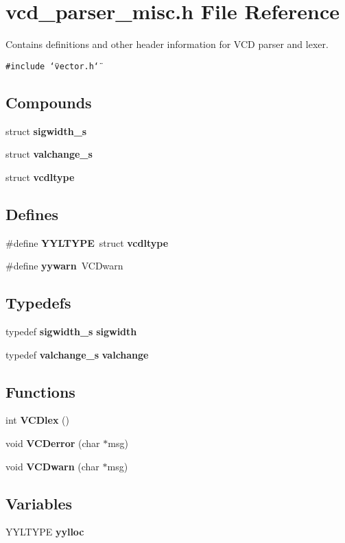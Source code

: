 \section{vcd\_\-parser\_\-misc.h File Reference}
\label{vcd__parser__misc_8h}
Contains definitions and other header information for VCD parser and lexer. 


{\tt \#include \char`\"{}vector.h\char`\"{}}\par
\subsection*{Compounds}
\begin{CompactItemize}
\item 
struct {\bf sigwidth\_\-s}
\item 
struct {\bf valchange\_\-s}
\item 
struct {\bf vcdltype}
\end{CompactItemize}
\subsection*{Defines}
\begin{CompactItemize}
\item 
\#define {\bf YYLTYPE}\ struct {\bf vcdltype}
\item 
\#define {\bf yywarn}\ VCDwarn
\end{CompactItemize}
\subsection*{Typedefs}
\begin{CompactItemize}
\item 
typedef {\bf sigwidth\_\-s} {\bf sigwidth}
\item 
typedef {\bf valchange\_\-s} {\bf valchange}
\end{CompactItemize}
\subsection*{Functions}
\begin{CompactItemize}
\item 
int {\bf VCDlex} ()
\item 
void {\bf VCDerror} (char $\ast$msg)
\item 
void {\bf VCDwarn} (char $\ast$msg)
\end{CompactItemize}
\subsection*{Variables}
\begin{CompactItemize}
\item 
YYLTYPE {\bf yylloc}
\end{CompactItemize}


